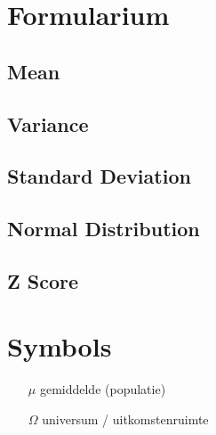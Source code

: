 \documentclass[a4paper]{article}
\begin{document}
\twocolumn

\section{Formularium}

\subsection{Mean}


\subsection{Variance}


\subsection{Standard Deviation}


\subsection{Normal Distribution}


\subsection{Z Score}


\section{Symbols}

\begin{itemize}
\item[$\mu$] gemiddelde (populatie)
\item[$\Omega$] universum / uitkomstenruimte
\end{itemize}

\onecolumn
\end{document}

